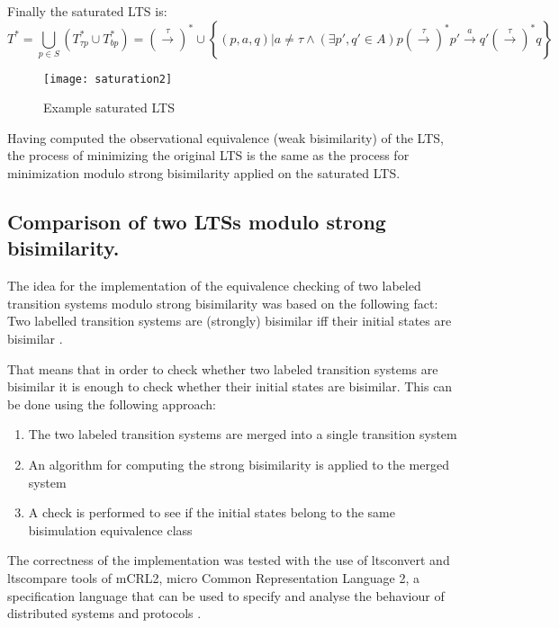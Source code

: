 Finally the saturated LTS is:
\begin{equation*}
	T^{*}=\bigcup_{p\in S}\left(T^{*}_{\tau p}\cup T^{*}_{bp}\right)=\left(\stackrel{\tau}{\rightarrow}\right)^{*}\cup\left\{\left(p,a,q\right)|a\neq\tau\wedge\left(\exists p',q'\in A\right) p\left(\stackrel{\tau}{\rightarrow}\right)^{*}p'\stackrel{a}{\rightarrow}q'\left(\stackrel{\tau}{\rightarrow}\right)^{*}q\right\}
\end{equation*}

\begin{figure}[!ht]
\centering
\texttt{[image: saturation2]}
\caption{Example saturated LTS}
\label{fig:saturation2}
\end{figure}

Having computed the observational equivalence (weak bisimilarity) of the LTS, the process of minimizing the original LTS is the same as the process for minimization modulo strong bisimilarity applied on the saturated LTS.

\subsection{Comparison of two LTSs modulo strong bisimilarity.}
The idea for the implementation of the equivalence checking of two labeled transition systems modulo strong bisimilarity was based on the following fact: Two labelled transition systems are (strongly) bisimilar iff their initial states are bisimilar \cite{ModellingAndAnalysis}.

That means that in order to check whether two labeled transition systems are bisimilar it is enough to check whether their initial states are bisimilar. This can be done using the following approach:
\begin{enumerate}
	\item The two labeled transition systems are merged into a single transition system
	\item An algorithm for computing the strong bisimilarity is applied to the merged system
	\item A check is performed to see if the initial states belong to the same bisimulation equivalence class
\end{enumerate}

The correctness of the implementation was tested with the use of ltsconvert and ltscompare tools of mCRL2, micro Common Representation Language 2, a specification language that can be used to specify and analyse the behaviour of distributed systems and protocols
\cite{mCRL2Ref}.

